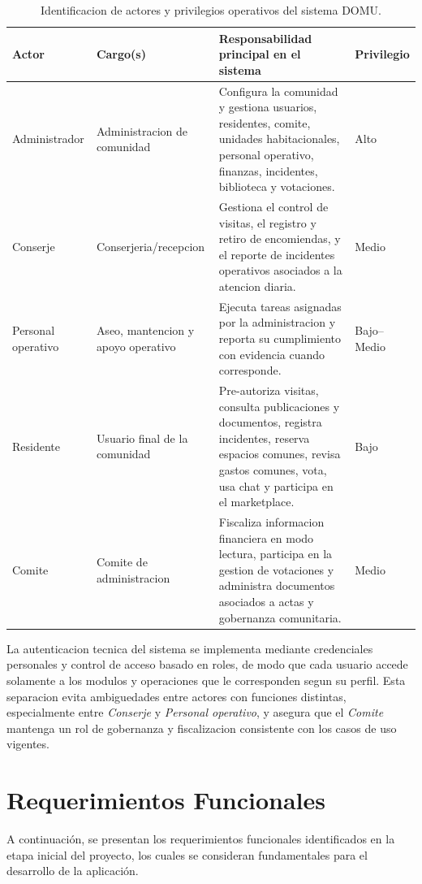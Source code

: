 \begin{table}[H]
\centering
\setlength{\tabcolsep}{4pt}
\renewcommand{\arraystretch}{1.15}
\begin{tabular}{|p{}|p{}|p{}|p{}|}
\hline
\textbf{Actor} & \textbf{Cargo(s)} & \textbf{Responsabilidad principal en el sistema} & \textbf{Privilegio} \\ \hline
Administrador & Administracion de comunidad & Configura la comunidad y gestiona usuarios, residentes, comite, unidades habitacionales, personal operativo, finanzas, incidentes, biblioteca y votaciones. & Alto \\ \hline
Conserje & Conserjeria/recepcion & Gestiona el control de visitas, el registro y retiro de encomiendas, y el reporte de incidentes operativos asociados a la atencion diaria. & Medio \\ \hline
Personal operativo & Aseo, mantencion y apoyo operativo & Ejecuta tareas asignadas por la administracion y reporta su cumplimiento con evidencia cuando corresponde. & Bajo--Medio \\ \hline
Residente & Usuario final de la comunidad & Pre-autoriza visitas, consulta publicaciones y documentos, registra incidentes, reserva espacios comunes, revisa gastos comunes, vota, usa chat y participa en el marketplace. & Bajo \\ \hline
Comite & Comite de administracion & Fiscaliza informacion financiera en modo lectura, participa en la gestion de votaciones y administra documentos asociados a actas y gobernanza comunitaria. & Medio \\ \hline
\end{tabular}
\caption{Identificacion de actores y privilegios operativos del sistema DOMU.}
\label{tab:identificacion-usuarios}
\end{table}

La autenticacion tecnica del sistema se implementa mediante credenciales personales y control de acceso basado en roles, de modo que cada usuario accede solamente a los modulos y operaciones que le corresponden segun su perfil. Esta separacion evita ambiguedades entre actores con funciones distintas, especialmente entre \textit{Conserje} y \textit{Personal operativo}, y asegura que el \textit{Comite} mantenga un rol de gobernanza y fiscalizacion consistente con los casos de uso vigentes.

\section{Requerimientos Funcionales}
A continuación, se presentan los requerimientos funcionales identificados en la etapa inicial del proyecto, los cuales se consideran fundamentales para el desarrollo de la aplicación.

